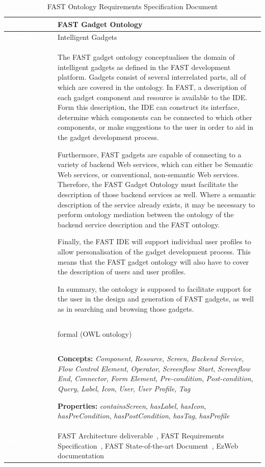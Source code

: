 \documentclass{fast_latex}
\begin{document}
\singlespacing
\begin{small}
\begin{longtable}[t]{|>{\columncolor{fast@lightgrey}}p{3.25cm}|p{11cm}|}
\caption{\label{tab:ontology_requirements_spec}FAST Ontology Requirements Specification Document}\\
\hline
\textcolor{white}{\textbf{Name}} & \textbf{FAST Gadget Ontology} \\ \hline
\textcolor{white}{\textbf{Domain}} & Intelligent Gadgets \\ \hline
\textcolor{white}{\textbf{Purpose}} & The FAST gadget ontology conceptualises the domain of intelligent gadgets as defined in the FAST development platform. Gadgets consist of several interrelated parts, all of which are covered in the ontology. In FAST, a description of each gadget component and resource is available to the IDE. Form this description, the IDE can construct its interface, determine which components can be connected to which other components, or make suggestions to the user in order to aid in the gadget development process.

Furthermore, FAST gadgets are capable of connecting to a variety of backend Web services, which can either be Semantic Web services, or conventional, non-semantic Web services. Therefore, the FAST Gadget Ontology must facilitate the description of those backend services as well. Where a semantic description of the service already exists, it may be necessary to perform ontology mediation between the ontology of the backend service description and the FAST ontology.

Finally, the FAST IDE will support individual user profiles to allow personalisation of the gadget development process. This means that the FAST gadget ontology will also have to cover the description of users and user profiles.

In summary, the ontology is supposed to facilitate support for the user in the design and generation of FAST gadgets, as well as in searching and browsing those gadgets.\\ \hline 
\textcolor{white}{\textbf{Level of Formality}} & formal (OWL ontology) \\ \hline
\textcolor{white}{\textbf{Scope}} & \textbf{Concepts:} \emph{Component}, \emph{Resource}, \emph{Screen}, \emph{Backend Service}, \emph{Flow Control Element}, \emph{Operator}, \emph{Screenflow Start}, \emph{Screenflow End}, \emph{Connector}, \emph{Form Element}, \emph{Pre-condition}, \emph{Post-condition}, \emph{Query}, \emph{Label}, \emph{Icon}, \emph{User}, \emph{User Profile}, \emph{Tag}

\textbf{Properties:} \emph{containsScreen}, \emph{hasLabel}, \emph{hasIcon}, \emph{hasPreCondition}, \emph{hasPostCondition}, \emph{hasTag}, \emph{hasProfile}\\ \hline
\textcolor{white}{\textbf{Sources of Knowledge}} & FAST Architecture deliverable~\cite{solero2009fast_architecture}, FAST Requirements Specification~\cite{villoslada2009fast_requirements}, FAST State-of-the-art Document~\cite{urmetzer2010fast_state_of_the_art}, EzWeb documentation~\cite{lizcano2008ezweb} \\ \hline
\end{longtable}
\end{small}
\end{document}
